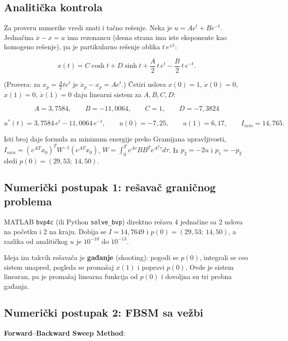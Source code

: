 \documentclass[11pt,a4paper,parskip=half,headsepline,numbers=noenddot]{scrartcl}
\begin{document}
\subsection{Analitička kontrola}

Za proveru numerike vredi znati i tačno rešenje. Neka je \(u = Ae^t + Be^{-t}\). Jednačina \(\ddot x - x = u\) ima rezonancu (desna strana ima iste eksponente kao homogeno rešenje), pa je partikularno rešenje oblika \(t\,e^{\pm t}\):

\[x(t) = C\cosh t + D\sinh t + \frac A2\,t\,e^t - \frac B2\,t\,e^{-t} .\]

(Provera: za \(x_p = \frac A2te^t\) je \(\ddot x_p - x_p = Ae^t\).) Četiri uslova \(x(0) = 1\), \(\dot x(0) = 0\), \(x(1) = 0\), \(\dot x(1) = 0\) daju linearni sistem za \(A, B, C, D\):

\[A = 3{,}7584, \qquad B = -11{,}0064, \qquad C = 1, \qquad D = -7{,}3824\]

\[u^*(t) = 3{,}7584\,e^t - 11{,}0064\,e^{-t}, \qquad u(0) = -7{,}25, \qquad u(1) = 6{,}17, \qquad I_{min} = 14{,}765 .\]

Isti broj daje formula za minimum energije preko Gramijana upravljivosti, \(I_{min} = (e^{AT}x_0)^TW^{-1}(e^{AT}x_0)\), \(W = \int_0^Te^{A\tau}BB^Te^{A^T\tau}d\tau\). Iz \(p_2 = -2u\) i \(p_1 = -\dot p_2\) sledi \(p(0) = (29{,}53;\ 14{,}50)\).

\subsection{Numerički postupak 1: rešavač graničnog problema}

MATLAB \texttt{bvp4c} (ili Python \texttt{solve\_bvp}) direktno rešava 4 jednačine sa 2 uslova na početku i 2 na kraju. Dobija se \(I = 14{,}7649\) i \(p(0) = (29{,}53;\ 14{,}50)\), a razlika od analitičkog \(u\) je \(10^{-10}\) do \(10^{-13}\).

Ideja iza takvih rešavača je \textbf{gađanje} (shooting): pogodi se \(p(0)\), integrali se ceo sistem unapred, pogleda se promašaj \(x(1)\) i popravi \(p(0)\). Ovde je sistem linearan, pa je promašaj linearna funkcija od \(p(0)\) i dovoljna su tri probna gađanja.

\subsection{Numerički postupak 2: FBSM sa vežbi}

\textbf{Forward--Backward Sweep Method}:
\end{document}
